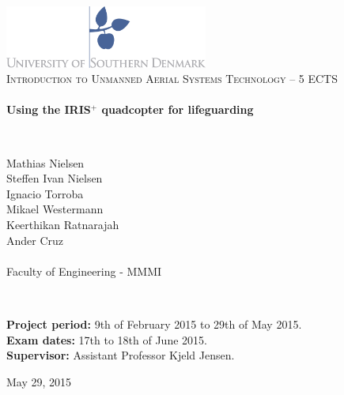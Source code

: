 \begin{titlepage}
\begin{center}

\includegraphics[width=0.5\textwidth]{./Images/logo.jpg}~\\[2cm]


\textsc{\Large Introduction to Unmanned Aerial Systems Technology -- 5 ECTS}\\[1.5cm]

\HRule \\[0.4cm]
{ \huge \bfseries Using the IRIS$^{+}$ quadcopter for lifeguarding  \\[0.4cm] }

\HRule \\[1.5cm]


\begin{center}
\begin{minipage}{0.5\textwidth} 
\large 
\center
\LARGE
Mathias Nielsen\\%
\LARGE
Steffen Ivan Nielsen\\ 
\LARGE
Ignacio Torroba\\
\LARGE
Mikael Westermann \\
\LARGE
Keerthikan Ratnarajah \\ 
\LARGE
Ander Cruz \\
\large
~\\
Faculty of Engineering - MMMI

\end{minipage}
\end{center}

~\\[3cm]

\begin{flushleft}
\begin{minipage}{1\textwidth}
\large

\textbf{Project period:} 9th of February 2015 to 29th of May 2015.\\[0.3cm]
\textbf{Exam dates:} 17th to 18th of June 2015.\\[0.3cm]
\textbf{Supervisor:} Assistant Professor Kjeld Jensen.\\

\end{minipage}

\end{flushleft}

\vfill

{\large May 29, 2015}
\end{center}
\end{titlepage}